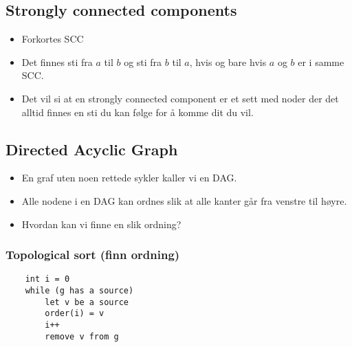 \documentclass{article}
\begin{document}
    \subsection{Strongly connected components}
    \begin{itemize}
        \item Forkortes SCC
        \item Det finnes sti fra \( a \) til \( b \) og sti fra \(  b \) til \( a \), hvis og bare hvis \( a \) og \( b  \) er i samme SCC.
        \item Det vil si at en strongly connected component er et sett med noder der det alltid finnes en sti du kan følge for å komme dit du vil.
    \end{itemize}

    \subsection{Directed Acyclic Graph}
    \begin{itemize}
        \item En graf uten noen rettede sykler kaller vi en DAG.
        \item Alle nodene i en DAG kan ordnes slik at alle kanter går fra venstre til høyre.
        \item Hvordan kan vi finne en slik ordning?
    \end{itemize}

    \subsubsection{Topological sort (finn ordning)}
    \begin{lstlisting}
    int i = 0
    while (g has a source)
        let v be a source 
        order(i) = v
        i++
        remove v from g
    \end{lstlisting}
\end{document}
